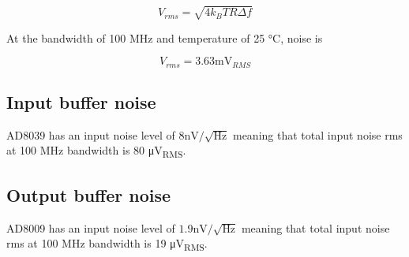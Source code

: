 \documentclass[11pt]{article}
\begin{document}
\begin{equation}
  V_{rms} = \sqrt{4 k_B T R \Delta f}
\end{equation}

At the bandwidth of 100 \si{\mega \hertz} and temperature of 25 \si{\celsius}, noise is

\begin{equation}
  V_{rms} = 3.63 \si{\milli \volt_{RMS}}
\end{equation}

\subsection{Input buffer noise}

AD8039 has an input noise level of $8 \si{\nano \volt} / \sqrt{\si{\hertz}}$ meaning 
that total input noise rms at 100 \si{\mega \hertz} bandwidth is 80 \si{\micro \volt_{RMS}}.

\subsection{Output buffer noise}
AD8009 has an input noise level of $1.9 \si{\nano \volt} / \sqrt{\si{\hertz}}$ meaning 
that total input noise rms at 100 \si{\mega \hertz} bandwidth is 19 \si{\micro \volt_{RMS}}.
\end{document}
